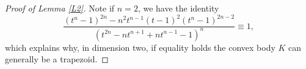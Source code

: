 \documentclass[10pt,a4paper]{amsart}
\begin{document}
\begin{proof}[Proof of Lemma \ref{L2}]
Note if $n=2$, we have the identity
\[
\frac{\left(t^n-1\right)^{2 n}-n^2 t^{n-1}(t-1)^2\left(t^n-1\right)^{2 n-2}}{\left(t^{2 n}-n t^{n+1}+n t^{n-1}-1\right)^n} \equiv  1,
\]
which explains why, in dimension two, if equality holds the convex body $K$ can generally be a trapezoid.
\end{proof}
\end{document}
